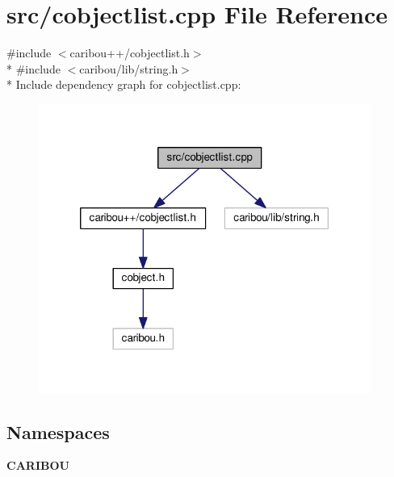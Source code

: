 \section{src/cobjectlist.cpp File Reference}
\label{cobjectlist_8cpp}
{\ttfamily \#include $<$caribou++/cobjectlist.\-h$>$}\\*
{\ttfamily \#include $<$caribou/lib/string.\-h$>$}\\*
Include dependency graph for cobjectlist.\-cpp\-:\nopagebreak
\begin{figure}[H]
\begin{center}
\leavevmode
\includegraphics[width=309pt]{cobjectlist_8cpp__incl}
\end{center}
\end{figure}
\subsection*{Namespaces}
\begin{DoxyCompactItemize}
\item 
{\bf C\-A\-R\-I\-B\-O\-U}
\end{DoxyCompactItemize}

